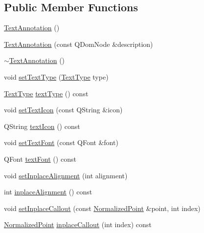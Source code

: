 \subsection*{Public Member Functions}
\begin{DoxyCompactItemize}
\item 
\hyperlink{classOkular_1_1TextAnnotation_a58b2cb10e88267570c934d6736009c70}{Text\+Annotation} ()
\item 
\hyperlink{classOkular_1_1TextAnnotation_a1eb50e2bce6803205d14867bd8595743}{Text\+Annotation} (const Q\+Dom\+Node \&description)
\item 
\hyperlink{classOkular_1_1TextAnnotation_a9d5f05c8e32ad33a4283bac5066f9140}{$\sim$\+Text\+Annotation} ()
\item 
void \hyperlink{classOkular_1_1TextAnnotation_aa755aebfdc64ce680064d4e9f64dde92}{set\+Text\+Type} (\hyperlink{classOkular_1_1TextAnnotation_af560204454bf812797bc95bea730b06e}{Text\+Type} type)
\item 
\hyperlink{classOkular_1_1TextAnnotation_af560204454bf812797bc95bea730b06e}{Text\+Type} \hyperlink{classOkular_1_1TextAnnotation_acf75a9a22542d3008a486298972e6dcf}{text\+Type} () const 
\item 
void \hyperlink{classOkular_1_1TextAnnotation_a4fc186a6617f71488283fa6f7dcf8222}{set\+Text\+Icon} (const Q\+String \&icon)
\item 
Q\+String \hyperlink{classOkular_1_1TextAnnotation_a40844236e2ea8684a6b439c2c3784821}{text\+Icon} () const 
\item 
void \hyperlink{classOkular_1_1TextAnnotation_adcf0c9d4bbf9445753ff1f082432378b}{set\+Text\+Font} (const Q\+Font \&font)
\item 
Q\+Font \hyperlink{classOkular_1_1TextAnnotation_aa48f194058046e70141412a5e85e7199}{text\+Font} () const 
\item 
void \hyperlink{classOkular_1_1TextAnnotation_a469a5ee0efdbb56d009262f80a8dec23}{set\+Inplace\+Alignment} (int alignment)
\item 
int \hyperlink{classOkular_1_1TextAnnotation_ada96fce5c424867d6b48a8ae39a8cace}{inplace\+Alignment} () const 
\item 
void \hyperlink{classOkular_1_1TextAnnotation_a358a1d173ed0453e4db86034784a7891}{set\+Inplace\+Callout} (const \hyperlink{classOkular_1_1NormalizedPoint}{Normalized\+Point} \&point, int index)
\item 
\hyperlink{classOkular_1_1NormalizedPoint}{Normalized\+Point} \hyperlink{classOkular_1_1TextAnnotation_a5acb61c06f28b13fc92f786748a79948}{inplace\+Callout} (int index) const 

\end{DoxyCompactItemize}
